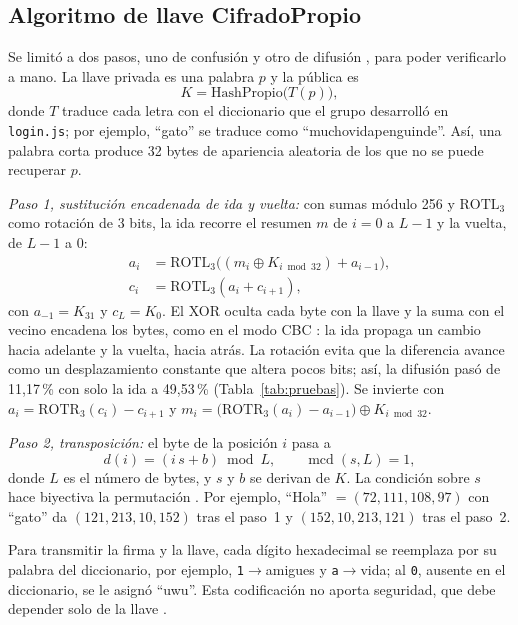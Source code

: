 \documentclass[conference]{IEEEtran}
\begin{document}
\subsection{Algoritmo de llave CifradoPropio}

Se limitó a dos pasos, uno de confusión y otro de difusión \cite{shannon}, para poder verificarlo a mano. La llave privada es una palabra $p$ y la pública es
\begin{equation}
K = \mathrm{HashPropio}\bigl(T(p)\bigr),
\end{equation}
donde $T$ traduce cada letra con el diccionario que el grupo desarrolló en \texttt{login.js}; por ejemplo, ``gato'' se traduce como ``muchovidapenguinde''. Así, una palabra corta produce 32 bytes de apariencia aleatoria de los que no se puede recuperar $p$.

\textit{Paso 1, sustitución encadenada de ida y vuelta:} con sumas módulo 256 y $\mathrm{ROTL}_3$ como rotación de 3 bits, la ida recorre el resumen $m$ de $i = 0$ a $L-1$ y la vuelta, de $L-1$ a $0$:
\begin{align}
a_i &= \mathrm{ROTL}_3\bigl((m_i \oplus K_{i \bmod 32}) + a_{i-1}\bigr), \\
c_i &= \mathrm{ROTL}_3(a_i + c_{i+1}),
\end{align}
con $a_{-1} = K_{31}$ y $c_L = K_0$. El XOR oculta cada byte con la llave y la suma con el vecino encadena los bytes, como en el modo CBC \cite{menezes}: la ida propaga un cambio hacia adelante y la vuelta, hacia atrás. La rotación evita que la diferencia avance como un desplazamiento constante que altera pocos bits; así, la difusión pasó de 11,17\,\% con solo la ida a 49,53\,\% (Tabla~\ref{tab:pruebas}). Se invierte con $a_i = \mathrm{ROTR}_3(c_i) - c_{i+1}$ y $m_i = \bigl(\mathrm{ROTR}_3(a_i) - a_{i-1}\bigr) \oplus K_{i \bmod 32}$.

\textit{Paso 2, transposición:} el byte de la posición $i$ pasa a
\begin{equation}
d(i) = (i\,s + b) \bmod L, \qquad \operatorname{mcd}(s, L) = 1,
\end{equation}
donde $L$ es el número de bytes, y $s$ y $b$ se derivan de $K$. La condición sobre $s$ hace biyectiva la permutación \cite{menezes}. Por ejemplo, ``Hola'' $= (72, 111, 108, 97)$ con ``gato'' da $(121, 213, 10, 152)$ tras el paso~1 y $(152, 10, 213, 121)$ tras el paso~2.

Para transmitir la firma y la llave, cada dígito hexadecimal se reemplaza por su palabra del diccionario, por ejemplo, \texttt{1}$\to$amigues y \texttt{a}$\to$vida; al \texttt{0}, ausente en el diccionario, se le asignó ``uwu''. Esta codificación no aporta seguridad, que debe depender solo de la llave \cite{kerckhoffs}.
\end{document}
